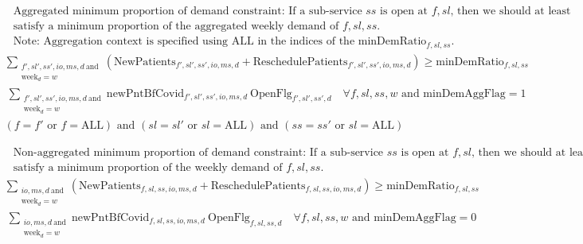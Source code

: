\documentclass[10pt, letterpaper]{article}
\begin{document}
\begin{align*}
&\text{Aggregated minimum proportion of demand constraint: If a sub-service $ss$ is open at $f,sl$, then we should at least} \\
&\text{satisfy a minimum proportion of the aggregated weekly demand of $f,sl,ss$.} \\
&\text{Note: Aggregation context is specified using ALL in the indices of the $\text{minDemRatio}_{f,sl,ss}$.} 
\end{align*}
\begin{equation} 
\begin{multlined}
\sum_{\substack{f',sl',ss',io,ms,d \ \text{and} \\
\text{week}_{d} = w }} (\text{NewPatients}_{f',sl',ss',io,ms,d} + \text{ReschedulePatients}_{f',sl',ss',io,ms,d})
\geq  \text{minDemRatio}_{f,sl,ss} \\ \ \sum_{\substack{f',sl',ss',io,ms,d \ \text{and} \\
\text{week}_{d} = w }} \text{newPntBfCovid}_{f',sl',ss',io,ms,d} \ \text{OpenFlg}_{f',sl',ss',d} \quad \forall f,sl,ss,w \text{ and } \text{minDemAggFlag} = 1 \\
(f = f' \text{ or } f = \text{ALL}) \text{ and } (sl = sl' \text{ or } sl = \text{ALL}) \text{ and } (ss=ss' \text{ or } sl = \text{ALL})
\end{multlined}
\end{equation}

\begin{align*}
&\text{Non-aggregated minimum proportion of demand constraint: If a sub-service $ss$ is open at $f,sl$, then we should at  least} \\
&\text{satisfy a minimum proportion of the weekly demand of $f,sl,ss$.} 
\end{align*}
\begin{equation} 
\begin{multlined}
\sum_{\substack{io,ms,d \ \text{and} \\
\text{week}_{d} = w }} (\text{NewPatients}_{f,sl,ss,io,ms,d} + \text{ReschedulePatients}_{f,sl,ss,io,ms,d})
\geq  \text{minDemRatio}_{f,sl,ss} \\ \ \sum_{\substack{io,ms,d \ \text{and} \\
\text{week}_{d} = w }} \text{newPntBfCovid}_{f,sl,ss,io,ms,d} \ \text{OpenFlg}_{f,sl,ss,d} \quad \forall f,sl,ss,w \text { and } \text{minDemAggFlag} = 0\
\end{multlined}
\end{equation}
\end{document}
